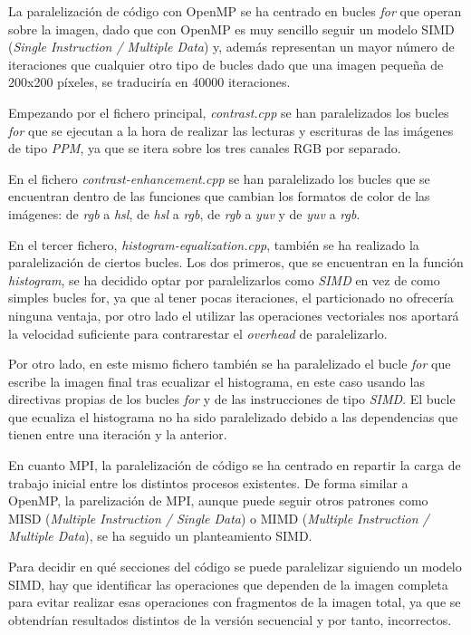 \documentclass[12pt]{report} %
\begin{document}
La paralelización de código con OpenMP se ha centrado en bucles \textit{for} que operan sobre la imagen,
dado que con OpenMP es muy sencillo seguir un modelo SIMD (\textit{Single Instruction / Multiple Data})
y, además representan un mayor número de iteraciones que cualquier otro tipo de bucles dado que una
imagen pequeña de 200x200 píxeles, se traduciría en 40000 iteraciones.

Empezando por el fichero principal, \textit{contrast.cpp} se han paralelizados los bucles
\textit{for} que se ejecutan a la hora de realizar las lecturas y escrituras de las imágenes de
tipo \textit{PPM}, ya que se itera sobre los tres canales RGB por separado.

En el fichero \textit{contrast-enhancement.cpp} se han paralelizado los bucles que
se encuentran dentro de las funciones que cambian los formatos de color de las imágenes: de \textit{rgb}
a \textit{hsl}, de \textit{hsl} a \textit{rgb}, de \textit{rgb} a \textit{yuv} y de \textit{yuv}
a \textit{rgb}.

En el tercer fichero, \textit{histogram-equalization.cpp}, también se ha realizado la paralelización
de ciertos bucles. Los dos primeros, que se encuentran en la función \textit{histogram}, se ha decidido
optar por paralelizarlos como \textit{SIMD} en vez de como simples bucles for, ya que al tener pocas
iteraciones, el particionado no ofrecería ninguna ventaja, por otro lado el utilizar las operaciones
vectoriales nos aportará la velocidad suficiente para contrarestar el \textit{overhead} de paralelizarlo.

Por otro lado, en este mismo fichero también se ha paralelizado el bucle \textit{for} que escribe la imagen
final tras ecualizar el histograma, en este caso usando las directivas propias de los bucles \textit{for} y
de las instrucciones de tipo \textit{SIMD}. El bucle que ecualiza el histograma no ha sido paralelizado
debido a las dependencias que tienen entre una iteración y la anterior.

En cuanto MPI, la paralelización de código se ha centrado en repartir la carga de trabajo inicial entre los distintos
procesos existentes. De forma similar a OpenMP, la parelización de MPI, aunque puede seguir otros
patrones como MISD (\textit{Multiple Instruction / Single Data}) o MIMD (\textit{Multiple Instruction
/ Multiple Data}), se ha seguido un planteamiento SIMD.

Para decidir en qué secciones del código se puede paralelizar siguiendo un modelo SIMD, hay que identificar
las operaciones que dependen de la imagen completa para evitar realizar esas operaciones con fragmentos de
la imagen total, ya que se obtendrían resultados distintos de la versión secuencial y por tanto, incorrectos.
\end{document}
